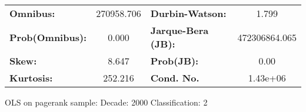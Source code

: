 \begin{center}
\begin{tabular}{lccccc}
\bottomrule
\end{tabular}
\begin{tabular}{lclc}
\textbf{Omnibus:}       & 270958.706 & \textbf{  Durbin-Watson:     } &       1.799    \\
\textbf{Prob(Omnibus):} &    0.000   & \textbf{  Jarque-Bera (JB):  } & 472306864.065  \\
\textbf{Skew:}          &    8.647   & \textbf{  Prob(JB):          } &        0.00    \\
\textbf{Kurtosis:}      &  252.216   & \textbf{  Cond. No.          } &    1.43e+06    \\
\bottomrule
\end{tabular}
\end{center}
\break
OLS on pagerank sample: Decade: 2000 Classification: 2
